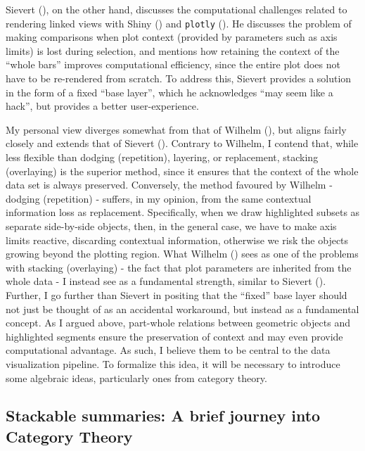 \documentclass[
  openany]{book}
\theoremstyle{definition}
\theoremstyle{definition}
\theoremstyle{definition}
\theoremstyle{definition}
\theoremstyle{remark}
\begin{document}
Sievert (), on the other hand, discusses the computational challenges related to rendering linked views with Shiny () and \texttt{plotly} (). He discusses the problem of making comparisons when plot context (provided by parameters such as axis limits) is lost during selection, and mentions how retaining the context of the ``whole bars'' improves computational efficiency, since the entire plot does not have to be re-rendered from scratch. To address this, Sievert provides a solution in the form of a fixed ``base layer'', which he acknowledges ``may seem like a hack'', but provides a better user-experience.

My personal view diverges somewhat from that of Wilhelm (), but aligns fairly closely and extends that of Sievert (). Contrary to Wilhelm, I contend that, while less flexible than dodging (repetition), layering, or replacement, stacking (overlaying) is the superior method, since it ensures that the context of the whole data set is always preserved. Conversely, the method favoured by Wilhelm - dodging (repetition) - suffers, in my opinion, from the same contextual information loss as replacement. Specifically, when we draw highlighted subsets as separate side-by-side objects, then, in the general case, we have to make axis limits reactive, discarding contextual information, otherwise we risk the objects growing beyond the plotting region. What Wilhelm () sees as one of the problems with stacking (overlaying) - the fact that plot parameters are inherited from the whole data - I instead see as a fundamental strength, similar to Sievert (). Further, I go further than Sievert in positing that the ``fixed'' base layer should not just be thought of as an accidental workaround, but instead as a fundamental concept. As I argued above, part-whole relations between geometric objects and highlighted segments ensure the preservation of context and may even provide computational advantage. As such, I believe them to be central to the data visualization pipeline. To formalize this idea, it will be necessary to introduce some algebraic ideas, particularly ones from category theory.

\subsection{Stackable summaries: A brief journey into Category Theory}\label{aggregation-category-theory}
\end{document}
